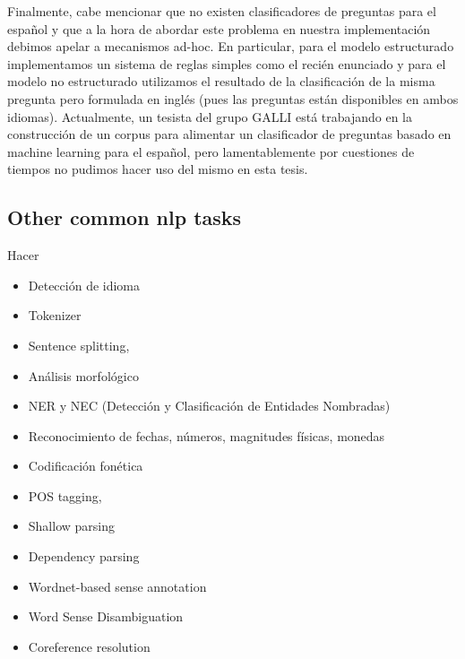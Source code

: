 Finalmente, cabe mencionar que no existen clasificadores de preguntas para el español y que a la hora de abordar este problema en nuestra implementación debimos apelar a mecanismos ad-hoc. En particular, para el modelo estructurado implementamos un sistema de reglas simples como el recién enunciado y para el modelo no estructurado utilizamos el resultado de la clasificación de la misma pregunta pero formulada en inglés (pues las preguntas están disponibles en ambos idiomas).
Actualmente, un tesista del grupo GALLI está trabajando en la construcción de un corpus para alimentar un clasificador de preguntas basado en machine learning para el español, pero lamentablemente por cuestiones de tiempos no pudimos hacer uso del mismo en esta tesis.


\subsection{Other common nlp tasks}
Hacer
\begin{itemize}
\item Detecci\'on de idioma
\item Tokenizer
\item Sentence splitting,
\item Análisis morfol\'ogico
\item NER y NEC (Detecci\'on y Clasificaci\'on de Entidades Nombradas)
\item Reconocimiento de fechas, números, magnitudes físicas, monedas
\item Codificaci\'on fonética
\item POS tagging, 
\item Shallow parsing
\item Dependency parsing
\item Wordnet-based sense annotation
\item Word Sense Disambiguation
\item Coreference resolution
\end{itemize}
